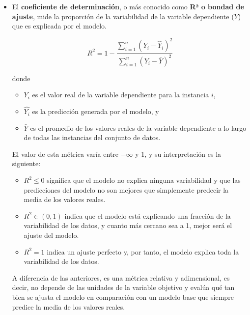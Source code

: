 \begin{itemize}
    \item El \textbf{coeficiente de determinación}, o más conocido como \textbf{R² o bondad de ajuste}, mide 
    la proporción de la variabilidad de la variable dependiente ($Y$) que es explicada por el modelo.

    $$
    R^2 = 1 - \frac{\sum_{i=1}^n (Y_i - \hat{Y}_i)^2}{\sum_{i=1}^n (Y_i - \bar{Y})^2}
    $$

    donde 

    \begin{itemize}

        \item $Y_i$ es el valor real de la variable dependiente para la instancia $i$,
        
        \item $\hat{Y_i}$ es la predicción generada por el modelo, y
        
        \item $\bar{Y}$ es el promedio de los valores reales de la variable dependiente a lo largo de todas 
        las instancias del conjunto de datos.
    
    \end{itemize}
    

    El valor de esta métrica varía entre $-\infty$ y 1, y su interpretación es la siguiente:

    \begin{itemize}

        \item $R^2 \le 0$ significa que el modelo no explica ninguna variabilidad y que las predicciones del 
        modelo no son mejores que simplemente predecir la media de los valores reales.
        
        \item $R^2 \in \left(0,1\right)$ indica que el modelo está explicando una fracción de la variabilidad 
        de los datos, y cuanto más cercano sea a 1, mejor será el ajuste del modelo.
        
        \item $R^2 = 1$ indica un ajuste perfecto y, por tanto, el modelo explica toda la variabilidad de los 
        datos. 
    
    \end{itemize}

    A diferencia de las anteriores, es una métrica relativa y adimensional, es decir, no depende de las 
    unidades de la variable objetivo y evalúa qué tan bien se ajusta el modelo en comparación con un modelo 
    base que siempre predice la media de los valores reales.
    
\end{itemize}

